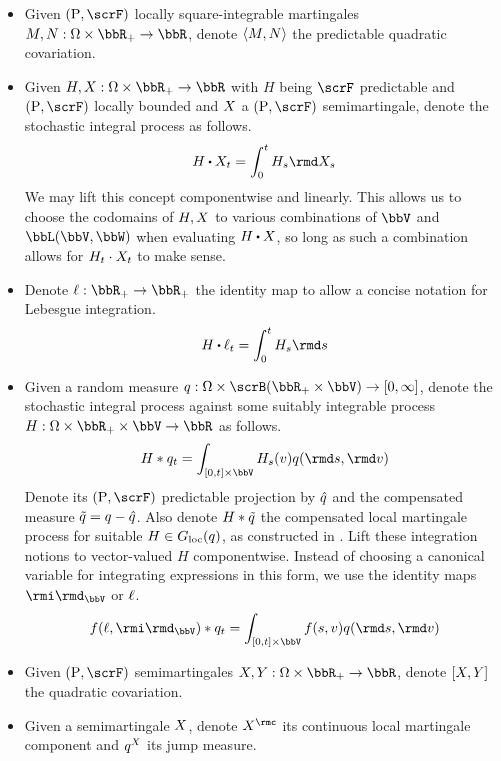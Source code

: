 \begin{itemize}
  \item
    Given $(\Prb,\scrF)$ locally square-integrable martingales $M, N: \Omega \times \bbR_+ \rightarrow \bbR$, denote ${\langle M , N \rangle}$ the predictable quadratic covariation.
  \item
    Given $H,\X: \Omega \times \bbR_+ \rightarrow \bbR$ with $H$ being $\scrF$ predictable and $(\Prb, \scrF)$ locally bounded and $X$ a $(\Prb, \scrF)$ semimartingale, denote the stochastic integral process as follows.
    \[
      H\shortInt \X_t = \int_0^t H_s \rmd\X_s
    \]
    We may lift this concept componentwise and linearly.
    This allows us to choose the codomains of $H, X$ to various combinations of $\vecSpace$ and $\bbL(\vecSpace, \bbW)$ when evaluating $H \shortInt \X$, so long as such a combination allows for $H_t \cdot X_t$ to make sense.
  \item
    Denote $\leb: \bbR_+ \rightarrow \bbR_+$ the identity map to allow a concise notation for Lebesgue integration.
    \[
      H \shortInt \leb_t = \int_0^t H_s \rmd s
    \]
  \item
    Given a random measure $\jumpMeas: \Omega \times \scrB(\bbR_+ \times \vecSpace) \rightarrow [0,\infty]$, denote the stochastic integral process against some suitably integrable process $H: \Omega \times \bbR_+ \times \vecSpace \rightarrow \bbR$ as follows.
    \[
      H \ast \jumpMeas_t = \int_{[0,t] \times \vecSpace} H_s(\markVar) \jumpMeas(\rmd s, \rmd\markVar)
    \]
    Denote its $(\Prb, \scrF)$ predictable projection by $\hat{q}$ and the compensated measure $\tilde{q} = q - \hat{q}$.
    Also denote $H \ast \tilde{q}$ the compensated local martingale process for suitable $H \in G_{\operatorname{loc}}(q)$, as constructed in \cite[Definition II.1.27]{jacod2003}.
    Lift these integration notions to vector-valued $H$ componentwise.
    Instead of choosing a canonical variable for integrating expressions in this form, we use the identity maps $\id_\vecSpace$ or $\ell$.
    \[
      f(\leb, \id_\vecSpace) \ast \jumpMeas_t = \int_{[0,t] \times \vecSpace} f(s, \markVar) \jumpMeas(\rmd s, \rmd\markVar)
    \]
  \item
    Given $(\Prb, \scrF)$ semimartingales $\X, Y: \Omega \times \bbR_+ \rightarrow \bbR$, denote $[X,Y]$ the quadratic covariation.
  \item
    Given a semimartingale $X$, denote $\X^\rmc$ its continuous local martingale component and $q^X$ its jump measure.
\end{itemize}

